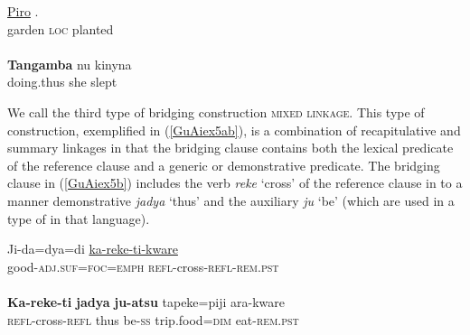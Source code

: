 \documentclass[output=paper]{LSP/langsci}
\begin{document}
\begin{exe}
	\ex	\label{GuAiex4ab}
\begin{xlist}
\ex	\label{GuAiex4a}
\gll		 \underline{Piro}   \underline{}   \underline{}.  \\
			garden  \textsc{loc}  planted\\
		\glt	{} \\
		\ex	\label{GuAiex4b}
\gll \textbf{Tangamba} nu   kinyna\\
doing.thus   she   slept \\
		\glt	{} 
		\end{xlist}
\end{exe}


We call the third type of bridging construction \textsc{mixed linkage}. This type of construction, exemplified in (\ref{GuAiex5ab}), is a combination of recapitulative and summary linkages in that the bridging clause contains both the lexical predicate of the reference clause and a generic or demonstrative predicate.  The bridging clause in (\ref{GuAiex5b}) includes the verb \textit{reke} `cross' of the reference clause in  to a manner demonstrative \textit{jadya} `thus' and the auxiliary \textit{ju} `be' (which are used in a type of  in that language).

\begin{exe}
	\ex	\label{GuAiex5ab}
\begin{xlist}
\ex	\label{GuAiex5a}
\gll		Ji-da=dya=di       \underline{ka-reke-ti-kware}  \\
good-\textsc{adj.suf}=\textsc{foc}=\textsc{emph}   \textsc{refl}-cross-\textsc{refl}-\textsc{rem.pst} \\
\glt	{} \\
\ex	\label{GuAiex5b}
\gll \textbf{Ka-reke-ti}      \textbf{jadya}   \textbf{ju-atsu} tapeke=piji   ara-kware\\
\textsc{refl}-cross-\textsc{refl}   thus   be-\textsc{ss}     trip.food=\textsc{dim}   eat-\textsc{rem.pst}\\
\glt	{} 
\end{xlist}
\end{exe}
\end{document}
